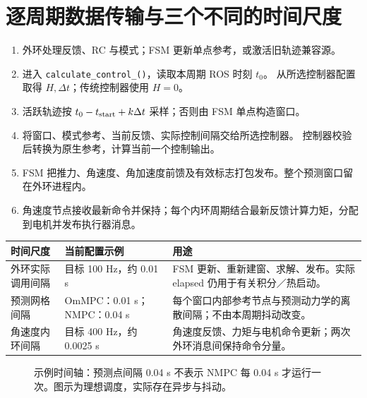 \documentclass[UTF8,a4paper,11pt,fontset=fandol]{ctexart}
\newcommand{\code}[1]{{\small\nolinkurl{#1}}}
\begin{document}
\section{逐周期数据传输与三个不同的时间尺度}
\label{sec:time}
\begin{enumerate}
\item 外环处理反馈、RC 与模式；FSM 更新单点参考，或激活旧轨迹兼容源。
\item 进入 \code{calculate_control_()}，读取本周期 ROS 时刻 $t_0$。
从所选控制器配置取得 $H,\Delta t$；传统控制器使用 $H=0$。
\item 活跃轨迹按 $t_0-t_{\rm start}+k\Delta t$ 采样；否则由 FSM 单点构造窗口。
\item 将窗口、模式参考、当前反馈、实际控制间隔交给所选控制器。
控制器校验后转换为原生参考，计算当前一个控制输出。
\item FSM 把推力、角速度、角加速度前馈及有效标志打包发布。整个预测窗口留在外环进程内。
\item 角速度节点接收最新命令并保持；每个内环周期结合最新反馈计算力矩，分配到电机并发布执行器消息。
\end{enumerate}

\begin{table}[h!]
\centering\small
\begin{tabularx}{\linewidth}{L{3.1cm}L{3.7cm}Y}
\toprule
时间尺度 & 当前配置示例 & 用途 \\\midrule
外环实际调用间隔 & 目标 100 Hz，约 0.01 s & FSM 更新、重新建窗、求解、发布。实际 elapsed 仍用于有关积分／热启动。\\
预测网格间隔 & OmMPC：0.01 s；NMPC：0.04 s & 每个窗口内部参考节点与预测动力学的离散间隔；不由本周期抖动改变。\\
角速度内环间隔 & 目标 400 Hz，约 0.0025 s & 角速度反馈、力矩与电机命令更新；两次外环消息间保持命令分量。\\
\bottomrule
\end{tabularx}
\end{table}

\begin{figure}[h!]
\centering
{}
\caption{示例时间轴：预测点间隔 0.04 s 不表示 NMPC 每 0.04 s 才运行一次。图示为理想调度，实际存在异步与抖动。}
\end{figure}
\end{document}
